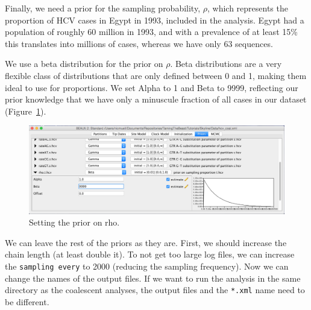 \documentclass[11pt]{article}
\newcommand{\fixme}[1]{\textcolor{red}{\texttt{{\bf FIX ME:} #1}}}
\begin{document}
Finally, we need a prior for the sampling probability, $\rho$, which represents the proportion of HCV cases in Egypt in 1993, included in the analysis. Egypt had a population of roughly 60 million in 1993, and with a prevalence of at least 15\% this translates into millions of cases, whereas we have only 63 sequences. 

We use a beta distribution for the prior on $\rho$. Beta distributions are a very flexible class of distributions that are only defined between 0 and 1, making them ideal to use for proportions. We set Alpha to 1 and Beta to 9999, reflecting our prior knowledge that we have only a minuscule fraction of all cases in our dataset (Figure~\ref{fig:rhoprior}).

\begin{figure}[h!]
\centering
\includegraphics[width=\textwidth]{figures/bdsky_prior_rho.png}
\caption{\small Setting the prior on rho.}
\label{fig:rhoprior}
\end{figure}

We can leave the rest of the priors as they are. First, we should increase the chain length (at least double it). To not get too large log files, we can increase the \texttt{sampling every} to 2000 (reducing the sampling frequency). Now we can change the names of the output files. If we want to run the analysis in the same directory as the coalescent analyses, the output files and the \texttt{*.xml} name need to be different.

\clearpage



\end{document}
